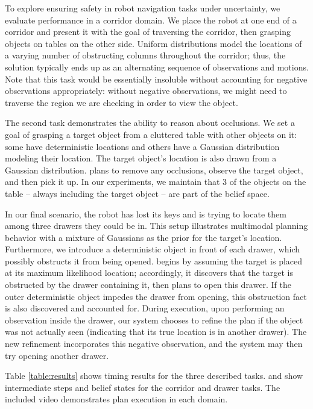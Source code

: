 To explore ensuring safety in robot navigation tasks under uncertainty, we
evaluate performance in a corridor domain. We place the robot at one end of a corridor
and present it with the goal of traversing the corridor, then grasping
objects on tables on the other side. Uniform distributions model the locations of
a varying number of obstructing columns throughout the corridor; thus, the solution
typically ends up as an alternating sequence of observations and motions. Note that this task would be essentially
insoluble without accounting for negative observations appropriately: without negative
observations, we might need to traverse the region we are checking in
order to view the object.

The second task demonstrates the ability to reason about occlusions. We
set a goal of grasping a target object from a cluttered table with other
objects on it: some have deterministic locations and others have a Gaussian distribution
modeling their location. The target object's location is also drawn from a Gaussian
distribution. \ibsp{} plans to remove any occlusions, observe the target object, and
then pick it up. In our experiments, we maintain that 3 of the objects on the table -- always including
the target object -- are part of the belief space.

In our final scenario, the robot has lost its keys and is trying to locate them among three drawers they could be in.
This setup illustrates multimodal planning behavior with a mixture of Gaussians as the prior for the target's location.
Furthermore, we introduce a deterministic object in front of each drawer, which possibly
obstructs it from being opened. \ibsp{} begins by assuming the target is placed at its maximum likelihood
location; accordingly, it discovers that the target is obstructed by the drawer containing it, then
plans to open this drawer. If the outer deterministic object impedes the drawer from opening, this
obstruction fact is also discovered and accounted for. During execution, upon performing an observation inside the drawer, our system
chooses to refine the plan if the object was not actually seen (indicating that its true location is in another drawer).
The new refinement incorporates this negative observation, and the system may then try opening another drawer.

Table \ref{table:results} shows timing results for the three described
tasks.  and  show intermediate steps and belief
states for the corridor and drawer tasks. The included video demonstrates plan execution in each domain.

